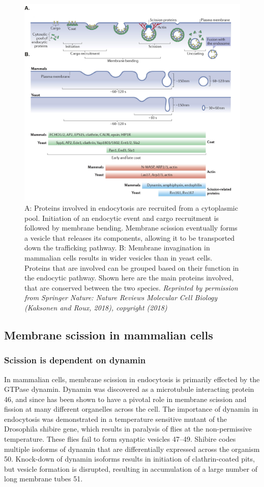 \begin{figure}[H]
	\centering
	\includegraphics[scale=0.8]{figures/intro/Fig2_kaksonen}
\caption[Endocytic pathway in mammalian and yeast cells]
{A: Proteins involved in endocytosis are recruited from a cytoplasmic pool. Initiation of an endocytic event and cargo recruitment is followed by membrane bending. Membrane scission eventually forms a vesicle that releases its components, allowing it to be transported down the trafficking pathway. B: Membrane invagination in mammalian cells results in wider vesicles than in yeast cells. Proteins that are involved can be grouped based on their function in the endocytic pathway. Shown here are the main proteins involved, that are conserved between the two species. 
	\textit{Reprinted by permission from Springer Nature: Nature Reviews Molecular Cell Biology (Kaksonen and Roux, 2018), copyright (2018)}}
\end{figure}
		
\subsection{Membrane scission in mammalian cells}
		\subsubsection{Scission is dependent on dynamin} 
		In mammalian cells, membrane scission in endocytosis is primarily effected by the GTPase dynamin. Dynamin was discovered as a microtubule interacting protein 46, and since has been shown to have a pivotal role in membrane scission and fission at many different organelles across the cell. The importance of dynamin in endocytosis was demonstrated in a temperature sensitive mutant of the Drosophila shibire gene, which results in paralysis of flies at the non-permissive temperature. These flies fail to form synaptic vesicles 47–49. Shibire codes multiple isoforms of dynamin that are differentially expressed across the organism 50. Knock-down of dynamin isoforms results in initiation of clathrin-coated pits, but vesicle formation is disrupted, resulting in accumulation of a large number of long membrane tubes 51. 

